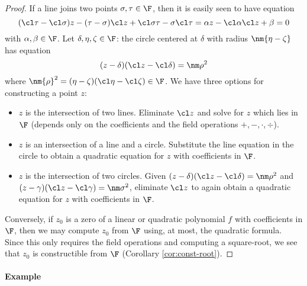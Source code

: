 \begin{proof}
If a line joins two points $\sigma,\tau\in\F$, then it is easily seen to have equation
\[(\cl\tau-\cl\sigma)z-(\tau-\sigma)\cl z+\cl\sigma\tau-\sigma\cl\tau=\alpha z-\cl\alpha \cl z+\beta=0\]
with $\alpha,\beta\in\F$. Let $\delta,\eta,\zeta\in\F$: the circle centered at $\delta$ with radius $\nm{\eta-\zeta}$ has equation
\[(z-\delta)(\cl z-\cl\delta)=\nm\rho^2\]
where $\nm{\rho}^2=(\eta-\zeta)(\cl\eta-\cl\zeta)\in\F$.
We have three options for constructing a point $z$:
\begin{itemize}
  \item $z$ is the intersection of two lines. Eliminate $\cl z$ and solve for $z$ which lies in $\F$ (depends only on the coefficients and the field operations $+,-,\cdot,\div$).
	\item $z$ is an intersection of a line and a circle. Substitute the line equation in the circle to obtain a quadratic equation for $z$ with coefficients in $\F$.
	\item $z$ is the intersection of two circles. Given $(z-\delta)(\cl z-\cl\delta)=\nm\rho^2$ and $(z-\gamma)(\cl z-\cl\gamma)=\nm\sigma^2$, eliminate $\cl z$ to again obtain a quadratic equation for $z$ with coefficients in $\F$.
\end{itemize}
Conversely, if $z_0$ is a zero of a linear or quadratic polynomial $f$ with coefficients in $\F$, then we may compute $z_0$ from $\F$ using, at most, the quadratic formula. Since this only requires the field operations and computing a square-root, we see that $z_0$ is constructible from $\F$ (Corollary \ref{cor:const-root}).
\end{proof}

\paragraph{Example}

